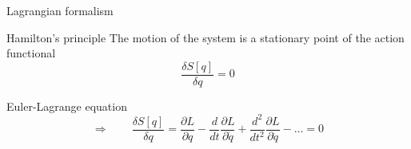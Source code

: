 \begin{frame}{Lagrangian formalism}
  \begin{alertblock}{Hamilton's principle}
    \vspace{0.5em}
    The motion of the system is a stationary point of the action
    functional~\cite{Goldstein11_Ham_principle}
    \begin{equation*}
      \frac{\delta S[q]}{\delta q} = 0
    \end{equation*}
  \end{alertblock}
  \begin{alertblock}{Euler-Lagrange equation}
    \vspace{0.5em}
    \begin{equation*}
      \Rightarrow \qquad
      \frac{\delta S[q]}{\delta q} =
      \frac{\partial L}{\partial q} -
      \frac{d}{dt}\frac{\partial L}{\partial \dot{q}} +
      \frac{d^2}{dt^2}\frac{\partial L}{\partial \ddot{q}} -
      \ldots = 0
    \end{equation*}
  \end{alertblock}
\end{frame}

